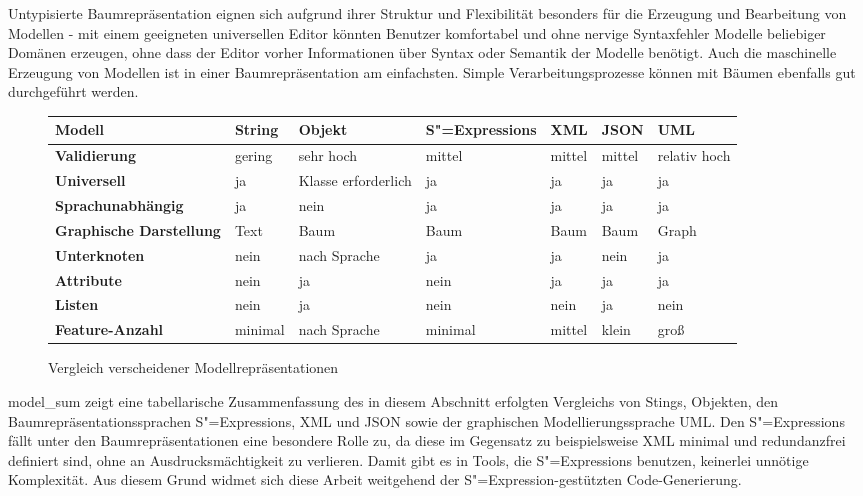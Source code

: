 \documentclass[11pt, a4paper, bibgerm]{book}
\newcommand\abb{}
\newcommand{\sexp}{S"=Expression}
\newcommand{\sexps}{S"=Expressions}
\begin{document}
Untypisierte Baumrepräsentation eignen sich aufgrund ihrer Struktur und
Flexibilität besonders für die Erzeugung und Bearbeitung von Modellen -
mit einem geeigneten universellen Editor könnten Benutzer komfortabel
und ohne nervige Syntaxfehler Modelle beliebiger Domänen erzeugen, ohne
dass der Editor vorher Informationen über Syntax oder Semantik der
Modelle benötigt. Auch die maschinelle Erzeugung von Modellen ist in
einer Baumrepräsentation am einfachsten. Simple Verarbeitungsprozesse
können mit Bäumen ebenfalls gut durchgeführt werden.

\begin{figure}
  \centering
\begin{tabular}{|l|l|l|l|l|l|l|}\hline
\bf Modell                 & \bf String & \bf Objekt           & \bf \sexps{} & \bf XML & \bf JSON & \bf UML         \\\hline\hline
\bf Validierung            & gering     & sehr hoch            & mittel       & mittel  & mittel   & relativ hoch    \\\hline
\bf Universell             & ja         & Klasse erforderlich  & ja           & ja      & ja       & ja              \\\hline
\bf Sprachunabhängig       & ja         & nein                 & ja           & ja      & ja       & ja              \\\hline
\bf Graphische Darstellung & Text       & Baum                 & Baum         & Baum    & Baum     & Graph           \\\hline
\bf Unterknoten            & nein       & nach Sprache         & ja           & ja      & nein     & ja              \\\hline
\bf Attribute              & nein       & ja                   & nein         & ja      & ja       & ja              \\\hline
\bf Listen                 & nein       & ja                   & nein         & nein    & ja       & nein            \\\hline
\bf Feature-Anzahl         & minimal    & nach Sprache         & minimal      & mittel  & klein    & groß            \\\hline
\end{tabular}
  \caption{Vergleich verscheidener Modellrepräsentationen}
  \label{magicl:fig:model_sum}
\end{figure}

\abb{model_sum} zeigt eine tabellarische Zusammenfassung des in diesem
Abschnitt erfolgten Vergleichs von Stings, Objekten, den
Baumrepräsentationssprachen \sexps{}, XML und JSON sowie der graphischen
Modellierungssprache UML. Den \sexps{} fällt unter den
Baumrepräsentationen eine besondere Rolle zu, da diese im Gegensatz zu
beispielsweise XML minimal und redundanzfrei definiert sind, ohne an
Ausdrucksmächtigkeit zu verlieren. Damit gibt es in Tools, die \sexps{}
benutzen, keinerlei unnötige Komplexität. Aus diesem Grund widmet sich
diese Arbeit weitgehend der \sexp-gestützten Code-Generierung.
\end{document}
